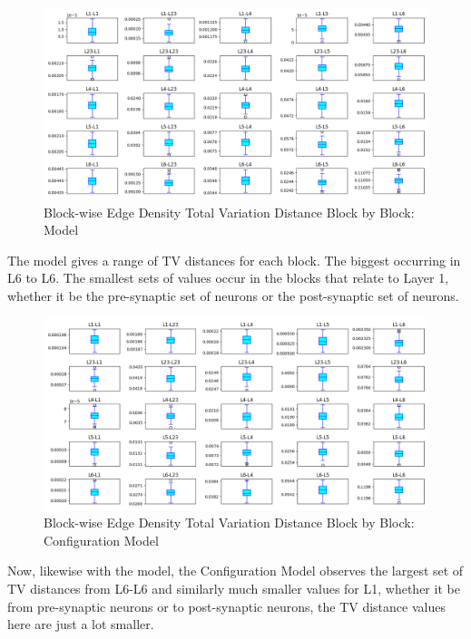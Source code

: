 \begin{figure}[H]
\begin{center}
\captionsetup{justification=centering}
\includegraphics[width=12cm]{results_imgs/er_bed.png}
\caption{Block-wise Edge Density Total Variation Distance Block by Block: \ER Model}
\end{center}
\end{figure}
The \ER model gives a range of TV distances for each block. The biggest occurring in L6 to L6. The smallest sets of values occur in the blocks that relate to Layer 1, whether it be the pre-synaptic set of neurons or the post-synaptic set of neurons.
\begin{figure}[H]
\begin{center}
\captionsetup{justification=centering}
\includegraphics[width=12cm]{results_imgs/conf_bed.png}
\caption{Block-wise Edge Density Total Variation Distance Block by Block: Configuration Model}
\end{center}
\end{figure}
Now, likewise with the \ER model, the Configuration Model observes the largest set of TV distances from L6-L6 and similarly much smaller values for L1, whether it be from pre-synaptic neurons or to post-synaptic neurons, the TV distance values here are just a lot smaller.

